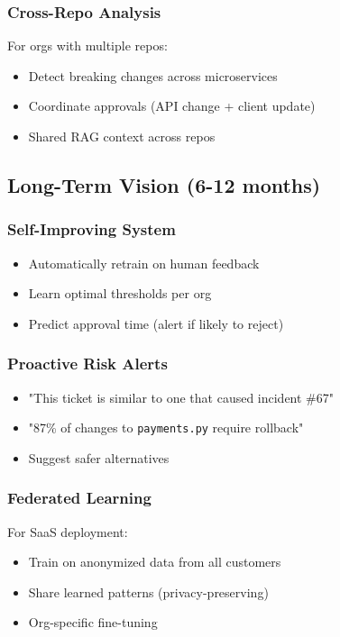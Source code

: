 \documentclass[11pt,a4paper]{article}
\begin{document}
\subsubsection{Cross-Repo Analysis}
For orgs with multiple repos:
\begin{itemize}
    \item Detect breaking changes across microservices
    \item Coordinate approvals (API change + client update)
    \item Shared RAG context across repos
\end{itemize}

\subsection{Long-Term Vision (6-12 months)}

\subsubsection{Self-Improving System}
\begin{itemize}
    \item Automatically retrain on human feedback
    \item Learn optimal thresholds per org
    \item Predict approval time (alert if likely to reject)
\end{itemize}

\subsubsection{Proactive Risk Alerts}
\begin{itemize}
    \item "This ticket is similar to one that caused incident \#67"
    \item "87\% of changes to \texttt{payments.py} require rollback"
    \item Suggest safer alternatives
\end{itemize}

\subsubsection{Federated Learning}
For SaaS deployment:
\begin{itemize}
    \item Train on anonymized data from all customers
    \item Share learned patterns (privacy-preserving)
    \item Org-specific fine-tuning
\end{itemize}
\end{document}
